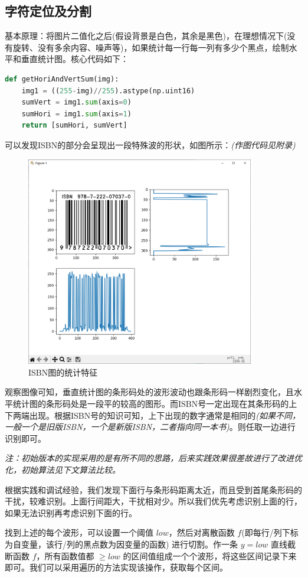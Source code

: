 \documentclass{ctexart}
\begin{document}
\subsection{字符定位及分割}
基本原理：将图片二值化之后(假设背景是白色，其余是黑色)，在理想情况下(没有旋转、没有多余内容、噪声等)，如果统计每一行每一列有多少个黑点，绘制水平和垂直统计图。核心代码如下：
\begin{lstlisting}[language=python]
def getHoriAndVertSum(img):
    img1 = ((255-img)//255).astype(np.uint16)
    sumVert = img1.sum(axis=0)
    sumHori = img1.sum(axis=1)
    return [sumHori, sumVert]
\end{lstlisting}
可以发现ISBN的部分会呈现出一段特殊波的形状，如图所示：\textit{(作图代码见附录)}
\begin{figure}[H]%
    \centering
    \includegraphics[height=260pt]{isbn_sum}
    \caption{ISBN图的统计特征}
\end{figure}

观察图像可知，垂直统计图的条形码处的波形波动也跟条形码一样剧烈变化，且水平统计图的条形码处是一段平的较高的图形。而ISBN号一定出现在其条形码的上下两端出现。根据ISBN号的知识可知，上下出现的数字通常是相同的\textit{(如果不同，一般一个是旧版ISBN，一个是新版ISBN，二者指向同一本书)}。则任取一边进行识别即可。

\textit{注：初始版本的实现采用的是有所不同的思路，后来实践效果很差故进行了改进优化，初始算法见下文算法比较。}

根据实践和调试经验，我们发现下面行与条形码距离太近，而且受到首尾条形码的干扰，较难识别。上面行间距大，干扰相对少。所以我们优先考虑识别上面的行，如果无法识别再考虑识别下面的行。

找到上述的每个波形，可以设置一个阈值 $low$，然后对离散函数 $f$(即每行/列下标为自变量，该行/列的黑点数为因变量的函数) 进行切割。作一条 $y=low$ 直线截断函数 $f$，所有函数值都 $\ge low$ 的区间值组成一个个波形，将这些区间记录下来即可。我们可以采用遍历的方法实现该操作，获取每个区间。
\end{document}
